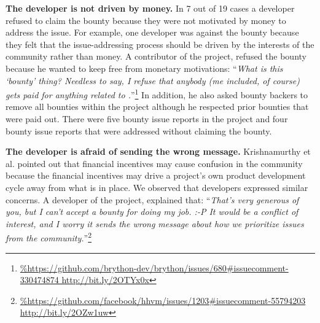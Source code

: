 \noindent\textbf{The developer is not driven by money.} In 7 out of 19 cases a developer refused to claim the bounty because they were not motivated by money to address the issue.
For example, one developer was against the bounty because they felt that the issue-addressing process should be driven by the interests of the community rather than money. A contributor of the  project,%
 refused the bounty because he wanted to keep  free from monetary motivations: ``\textit{What is this `bounty' thing? Needless to say, I refuse that anybody (me included, of course) gets paid for anything related to .}''\footnote{\url{%
http://bit.ly/2OTYx0x}} In addition, he also asked bounty backers to remove all bounties within the  project although he respected prior bounties that were paid out. There were five bounty issue reports in the  project and four bounty issue reports that were addressed without claiming the bounty.


\noindent\textbf{The developer is afraid of sending the wrong message.} Krishnamurthy et al. \cite{krishnamurthy2006bounty} pointed out that financial incentives may cause confusion in the community because the financial incentives may drive a project's own product development cycle away from what is in place.
We observed that developers expressed similar concerns. A developer of the  project,%
 explained that: ``\emph{That's very generous of you, but I can't accept a bounty for doing my job. :-P It would be a conflict of interest, and I worry it sends the wrong message about how we prioritize issues from the community.}''\footnote{\url{%
http://bit.ly/2OZw1uw}}






